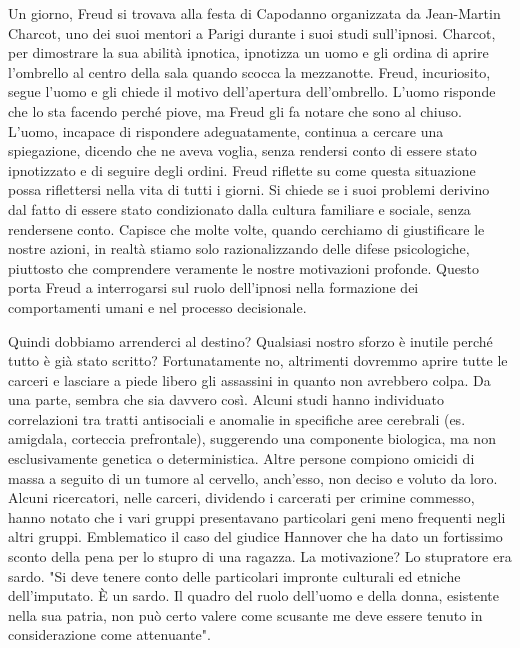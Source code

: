 \documentclass[12pt]{book} %
\begin{document}
Un giorno, Freud si trovava alla festa di Capodanno organizzata da Jean-Martin Charcot, uno dei suoi mentori a Parigi
durante i suoi studi sull'ipnosi. Charcot, per dimostrare la sua abilità ipnotica, ipnotizza un uomo e gli ordina di
aprire l'ombrello al centro della sala quando scocca la mezzanotte. Freud, incuriosito, segue l'uomo e gli chiede il
motivo dell'apertura dell'ombrello. L'uomo risponde che lo sta facendo perché piove, ma Freud gli fa notare che sono al
chiuso. L'uomo, incapace di rispondere adeguatamente, continua a cercare una spiegazione, dicendo che ne aveva voglia,
senza rendersi conto di essere stato ipnotizzato e di seguire degli ordini. Freud riflette su come questa situazione
possa riflettersi nella vita di tutti i giorni. Si chiede se i suoi problemi derivino dal fatto di essere stato
condizionato dalla cultura familiare e sociale, senza rendersene conto. Capisce che molte volte, quando cerchiamo di
giustificare le nostre azioni, in realtà stiamo solo razionalizzando delle difese psicologiche, piuttosto che
comprendere veramente le nostre motivazioni profonde. Questo porta Freud a interrogarsi sul ruolo dell'ipnosi nella
formazione dei comportamenti umani e nel processo decisionale.

Quindi dobbiamo arrenderci al destino? Qualsiasi nostro sforzo è inutile perché tutto è già stato scritto?
Fortunatamente no, altrimenti dovremmo aprire tutte le carceri e lasciare a piede libero gli assassini in quanto non
avrebbero colpa. Da una parte, sembra che sia davvero così. Alcuni studi hanno individuato correlazioni tra tratti antisociali e anomalie in specifiche aree cerebrali (es. amigdala, corteccia prefrontale), suggerendo una componente biologica, ma non esclusivamente genetica o deterministica. 
Altre persone compiono omicidi di massa a
seguito di un tumore al cervello, anch'esso, non deciso e voluto da loro. Alcuni ricercatori,
nelle carceri, dividendo i carcerati per crimine commesso, hanno notato che i vari gruppi presentavano particolari geni
meno frequenti negli altri gruppi. Emblematico il caso del giudice Hannover che ha dato un fortissimo sconto della pena
per lo stupro di una ragazza. La motivazione? Lo stupratore era sardo. "Si deve tenere conto delle
particolari impronte culturali ed etniche dell'imputato. È un sardo. Il quadro del ruolo dell'uomo e della donna,
esistente nella sua patria, non può certo valere come scusante me deve essere tenuto in considerazione come
attenuante".
\end{document}
